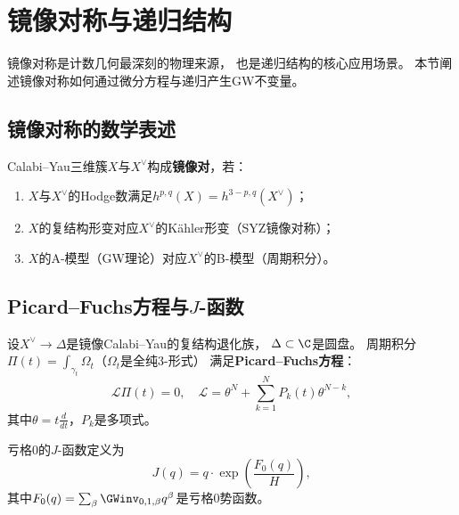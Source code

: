 
\section{镜像对称与递归结构}\label{sec:mirror}

镜像对称是计数几何最深刻的物理来源，
也是递归结构的核心应用场景。
本节阐述镜像对称如何通过微分方程与递归产生GW不变量。

\subsection{镜像对称的数学表述}

\begin{definition}[镜像对]\label{def:mirrorpair}
Calabi--Yau三维簇$X$与$X^\vee$构成\textbf{镜像对}，若：
\begin{enumerate}[label=(\arabic*)]
\item $X$与$X^\vee$的Hodge数满足$h^{p,q}(X) = h^{3-p,q}(X^\vee)$；
\item $X$的复结构形变对应$X^\vee$的Kähler形变（SYZ镜像对称）；
\item $X$的A-模型（GW理论）对应$X^\vee$的B-模型（周期积分）。
\end{enumerate}
\end{definition}

\subsection{Picard--Fuchs方程与$J$-函数}

\begin{definition}\label{def:pf}
设$X^\vee \to \Delta$是镜像Calabi--Yau的复结构退化族，
$\Delta \subset \C$是圆盘。
周期积分$\Pi(t) = \int_{\gamma_t} \Omega_t$（$\Omega_t$是全纯3-形式）
满足\textbf{Picard--Fuchs方程}：
\begin{equation}\label{eq:pf}
\mathcal{L} \Pi(t) = 0, \quad
\mathcal{L} = \theta^N + \sum_{k=1}^N P_k(t) \theta^{N-k},
\end{equation}
其中$\theta = t \frac{d}{dt}$，$P_k$是多项式。
\end{definition}

\begin{definition}[$J$-函数]\label{def:jfunc}
亏格0的$J$-函数定义为
\begin{equation}\label{eq:jfunc}
J(q) = q \cdot \exp\left( \frac{F_0(q)}{H} \right),
\end{equation}
其中$F_0(q) = \sum_\beta \GWinv_{0,1,\beta} q^\beta$是亏格0势函数。
\end{definition}

